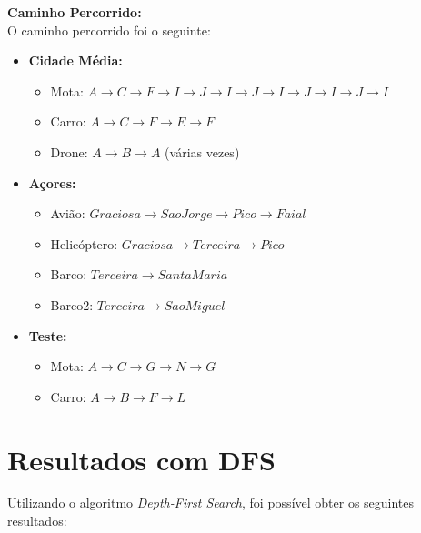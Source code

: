 \documentclass[a4paper,12pt]{scrreprt}
\begin{document}
\textbf{Caminho Percorrido:} \\
O caminho percorrido foi o seguinte:
\begin{itemize}
    \item \textbf{Cidade Média:}
        \begin{itemize}
            \item Mota: $A \rightarrow C \rightarrow F \rightarrow I \rightarrow J \rightarrow I
             \rightarrow J \rightarrow I \rightarrow J \rightarrow I \rightarrow J \rightarrow I$ \\
            \item Carro: $A \rightarrow C \rightarrow F \rightarrow E \rightarrow F$ \\
            \item Drone: $A \rightarrow B \rightarrow A$ (várias vezes)
        \end{itemize}
    \item \textbf{Açores:}
        \begin{itemize}
            \item Avião: $Graciosa \rightarrow Sao Jorge \rightarrow Pico \rightarrow Faial$ \\
            \item Helicóptero: $Graciosa \rightarrow Terceira \rightarrow Pico$ \\
            \item Barco: $Terceira \rightarrow Santa Maria$ \\
            \item Barco2: $Terceira \rightarrow Sao Miguel$
        \end{itemize}
    \item \textbf{Teste:}
        \begin{itemize}
            \item Mota: $A \rightarrow C \rightarrow G \rightarrow N \rightarrow G$ \\
            \item Carro: $A \rightarrow B \rightarrow F \rightarrow L$
        \end{itemize}
\end{itemize}

\clearpage

\section{Resultados com DFS}

Utilizando o algoritmo \textit{Depth-First Search}, foi possível obter os seguintes resultados:
\end{document}
